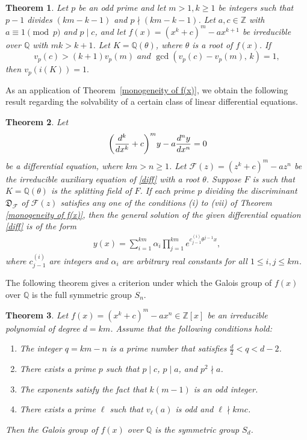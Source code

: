 \documentclass[table]{amsart}
\newtheorem{theorem}{Theorem}[section]
\newcommand{\Z}{\mathbb{Z}}
\newcommand{\Q}{\mathbb{Q}}
\newcommand{\D}{\mathfrak{D}}
\numberwithin{equation}{section}
\begin{document}
\begin{theorem}\label{nonmonogeneity}
Let $p$ be an odd prime and let $m >1 ,k \ge 1$ be integers such that $p-1$ divides $(km-k-1)$ and $p \nmid (km-k-1)$. 
Let $a,c \in \mathbb{Z}$ with $a \equiv 1 \pmod{p}$ and $p \mid c$, and let $f(x)=(x^k+c)^m-ax^{k+1}$
be irreducible over  $\mathbb{Q}$ with $mk>k+1$. Let $K=\mathbb{Q}(\theta)$, where $\theta$ is a root of $f(x)$. 
If \[v_p(c)>(k+1)v_p(m) \textit{ and } \gcd\!\left(v_p(c)-v_p(m),\,k\right)=1,\] then $v_p\!\left(i(K)\right)=1.$
\end{theorem}
As an application of Theorem~\ref{monogeneity of f(x)}, we obtain the following result regarding the solvability of a certain class of linear differential equations.
    \begin{theorem}{\label{t2}}
    Let \begin{equation}{\label{diff}}
        \left(\frac{d^k }{dx^k}+c\right)^m\!y-a\frac{d^ny }{dx^n}=0
    \end{equation}
    be a differential equation, where $km>n\geq 1$. Let $\mathcal{F}(z) =  (z^k+c)^m-az^n$ be the irreducible auxiliary equation of \eqref{diff}
  with a root $\theta$. Suppose $F$ is such that $K=\Q(\theta)$ is the splitting field of $F$. If each prime $p$ dividing the discriminant $\D_{\mathcal{F}}$
 of $\mathcal{F}(z)$ satisfies any one of the conditions \textup{(i)} to \textup{(vii)} of Theorem \ref{monogeneity of f(x)}, then the general
 solution of the given differential equation \eqref{diff} is of the form
\begin{align*}
    y(x) = \sum_{i=1}^{km} \alpha_i\prod_{j=1}^{km}e^{c_{j-1}^{(i)} \theta^{j-1}x},
\end{align*}
where $c_{j-1}^{(i)}$ are integers and $\alpha_i$ are arbitrary real constants for all $1\leq i,j \leq km$.
\end{theorem}
The following theorem gives a criterion under which the Galois group of $f(x)$ over $\mathbb{Q}$ is the full symmetric group $S_n$.

\begin{theorem} \label{galois group}
Let $f(x) = (x^k+c)^m - a x^n \in \Z[x]$ be an irreducible polynomial of degree $d = km$. Assume that the following conditions hold:
\begin{enumerate}
    \item The integer $q = km-n$ is a prime number that satisfies $\frac{d}{2} < q < d-2$.
    \item There exists a prime $p$ such that $p \mid c$, $p \mid a$, and $p^2 \nmid a$.
    \item The exponents satisfy the fact that $k(m-1)$ is an odd integer.
    \item There exists a prime $\ell$ such that $v_\ell(a)$ is odd and $\ell \nmid kmc$.
\end{enumerate}
Then the Galois group of $f(x)$ over $\Q$ is the symmetric group $S_{d}$.
\end{theorem}
\end{document}
